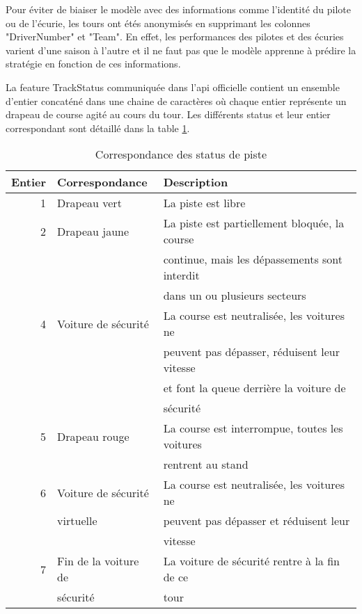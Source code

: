 Pour éviter de biaiser le modèle avec des informations comme l'identité du pilote ou de l'écurie, les tours ont étés anonymisés en supprimant les colonnes "DriverNumber" et "Team".
En effet, les performances des pilotes et des écuries varient d'une saison à l'autre et il ne faut pas que le modèle apprenne à prédire la stratégie en fonction de ces informations.

La feature TrackStatus communiquée dans l'api officielle contient un ensemble d'entier concaténé dans une chaine de caractères où chaque entier représente un drapeau de course agité au cours du tour.
Les différents status et leur entier correspondant sont détaillé dans la table \ref{track_status_table}.
\begin{table}[H]
    \begin{center}
        \caption{\label{track_status_table}Correspondance des status de piste}
        \begin{tabular}{r|l|l}
            Entier & Correspondance       & Description                                    \\ \hline
            1      & Drapeau vert         & La piste est libre                             \\
            2      & Drapeau jaune        & La piste est partiellement bloquée, la course  \\
                   &                      & continue, mais les dépassements sont interdit  \\
                   &                      & dans un ou plusieurs secteurs                  \\
            4      & Voiture de sécurité  & La course est neutralisée, les voitures ne     \\
                   &                      & peuvent pas dépasser, réduisent leur vitesse   \\
                   &                      & et font la queue derrière la voiture de        \\
                   &                      & sécurité                                       \\
            5      & Drapeau rouge        & La course est interrompue, toutes les voitures \\
                   &                      & rentrent au stand                              \\
            6      & Voiture de sécurité  & La course est neutralisée, les voitures ne     \\
                   & virtuelle            & peuvent pas dépasser et réduisent leur         \\
                   &                      & vitesse                                        \\
            7      & Fin de la voiture de & La voiture de sécurité rentre à la fin de ce   \\
                   & sécurité             & tour
        \end{tabular}
    \end{center}
\end{table}

